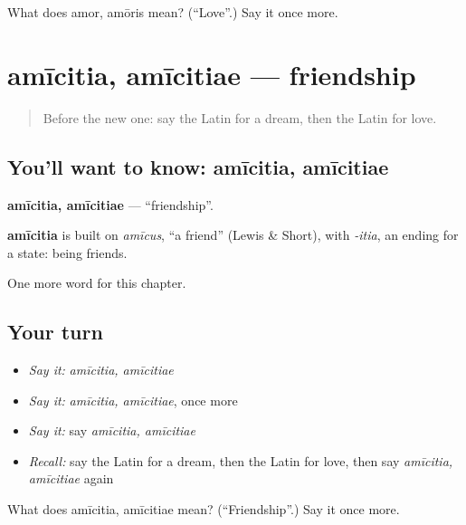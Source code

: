 \begin{tcolorbox}[breakable,colback=teal!4,colframe=teal!35!black,title={Before you move on}]
What does amor, amōris mean? (\textquotedblleft{}Love\textquotedblright{}.) Say it once more.
\end{tcolorbox}
\section[amīcitia, amīcitiae]{amīcitia, amīcitiae — friendship}

\label{lesson:LA-C236-amicitia}



\begin{quote}
Before the new one: say the Latin for a dream, then the Latin for love.
\end{quote}

\subsection*{You'll want to know: amīcitia, amīcitiae}
\textbf{amīcitia, amīcitiae} — \textquotedblleft{}friendship\textquotedblright{}.

\begin{cousinweb}
\textbf{amīcitia} is built on \emph{amīcus}, \textquotedblleft{}a friend\textquotedblright{} (Lewis \& Short), with \emph{-itia}, an ending for a state: being friends.
\end{cousinweb}

\begin{grammarlens}[title={What you've built}]
One more word for this chapter.
\end{grammarlens}

\subsection*{Your turn}
\begin{itemize}
\raggedright
  \item \emph{Say it:} \emph{amīcitia, amīcitiae}
  \item \emph{Say it:} \emph{amīcitia, amīcitiae}, once more
  \item \emph{Say it:} say \emph{amīcitia, amīcitiae}
  \item \emph{Recall:} say the Latin for a dream, then the Latin for love, then say \emph{amīcitia, amīcitiae} again
\end{itemize}

\begin{tcolorbox}[breakable,colback=teal!4,colframe=teal!35!black,title={Before you move on}]
What does amīcitia, amīcitiae mean? (\textquotedblleft{}Friendship\textquotedblright{}.) Say it once more.
\end{tcolorbox}
